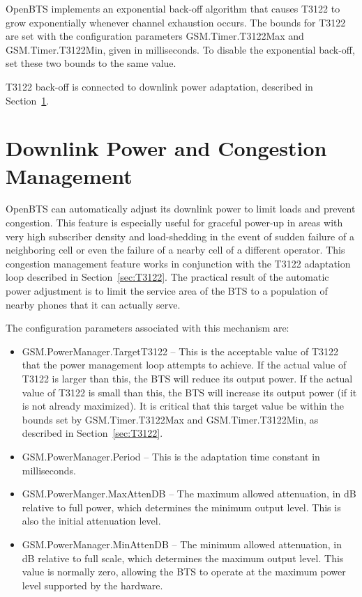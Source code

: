 \documentclass[11pt,openany]{book}
\begin{document}
OpenBTS implements an exponential back-off algorithm that causes T3122 to grow exponentially whenever channel exhaustion occurs.  The bounds for T3122 are set with the configuration parameters GSM.Timer.T3122Max and GSM.Timer.T3122Min, given in milliseconds. To disable the exponential back-off, set these two bounds to the same value.

T3122 back-off is connected to downlink power adaptation, described in Section~\ref{sec:powerManager}.


\section{Downlink Power and Congestion Management}
\label{sec:powerManager}
OpenBTS can automatically adjust its downlink power to limit loads and prevent congestion.  This feature is especially useful for graceful power-up in areas with very high subscriber density and load-shedding in the event of sudden failure of a neighboring cell or even the failure of a nearby cell of a different operator.  This congestion management feature works in conjunction with the T3122 adaptation loop described in Section~\ref{sec:T3122}.
The practical result of the automatic power adjustment is to limit the service area of the BTS to a population of nearby phones that it can actually serve.

The configuration parameters associated with this mechanism are:
\begin{itemize}
	\item GSM.PowerManager.TargetT3122 -- This is the acceptable value of T3122 that the power management loop attempts to achieve.  If the actual value of T3122 is larger than this, the BTS will reduce its output power.  If the actual value of T3122 is small than this, the BTS will increase its output power (if it is not already maximized).  It is critical that this target value be within the bounds set by GSM.Timer.T3122Max and GSM.Timer.T3122Min, as described in Section~\ref{sec:T3122}.
	\item GSM.PowerManager.Period -- This is the adaptation time constant in milliseconds.
	\item GSM.PowerManger.MaxAttenDB -- The maximum allowed attenuation, in dB relative to full power, which determines the minimum output level.  This is also the initial attenuation level. 
	\item GSM.PowerManager.MinAttenDB -- The minimum allowed attenuation, in dB relative to full scale, which determines the maximum output level.  This value is normally zero, allowing the BTS to operate at the maximum power level supported by the hardware.
\end{itemize}
\end{document}
